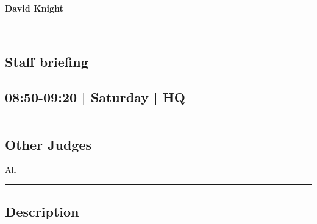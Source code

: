 \documentclass[10pt, A5]{article}
\newcommand{\newtitle}[1]{\begin{center}{\Huge\bfseries #1 }\\ \vspace{5mm}\end{center}}
\newcommand{\newsubtitle}[1]{\begin{center}{\color{grey}\Large\bfseries #1 }\\ \vspace{5mm}\end{center}}
\begin{document}
		\newtitle{David Knight}
	\newsubtitle{}



    
	
	

		\begin{framed}
			\begin{minipage}{\textwidth}

			\setcounter{section}{13}
							\section{Staff briefing}
						
			\subsection*{08:50-09:20 | Saturday | HQ}

			\vspace{0.25cm}
			\hrule
			\vspace{0.25cm}


			\subsection*{Other Judges}
							All

					\vspace{0.25cm}
			\hrule
			\vspace{0.25cm}

			\begin{minipage}{\textwidth}
			\subsection*{\faListAlt \: Description}
			
			\end{minipage}


	\end{minipage}
	\end{framed}

	
\end{document}
